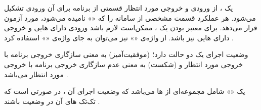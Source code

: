 
یک ، از ورودی و خروجی مورد انتظار قسمتی از برنامه برای
آن ورودی تشکیل می‌شود. هر عملکرد  قسمت مشخصی از سامانه را
که «» نامیده می‌شود، مورد آزمون قرار می‌دهد. برای معتبر بودن
یک ، ممکن‌است لازم باشد ورودی  دارای
‌هایی و خروجی دارای ‌هایی نیز
باشد. از واژه‌ی «» نیز می‌توان به جای واژه‌ی «»
استفاده کرد .

وضعیت اجرای یک  دو حالت دارد؛  (موفقیت‌آمیز) به
معنی سازگاری خروجی برنامه با خروجی مورد انتظار و  (شکست) به
معنی عدم سازگاری خروجی برنامه با خروجی مورد انتظار می‌باشد
.

یک «» شامل مجموعه‌ای از ‌ها می‌باشد که وضعیت
اجرای آن ، در صورتی  است که تک‌تک
‌های آن در وضعیت  باشند .


